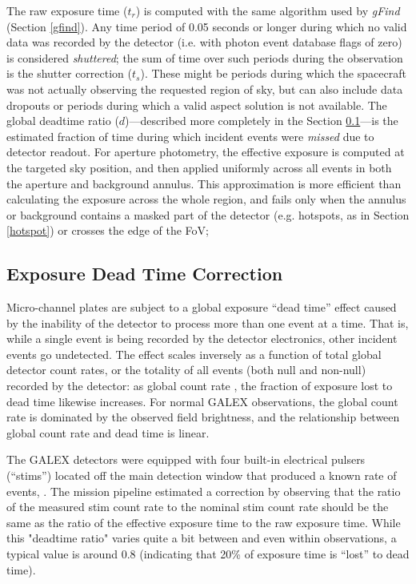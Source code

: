 \documentclass[trackchanges,preprint2]{aastex}
\begin{document}
The raw exposure time ($t_r$) is computed with the same algorithm used by \emph{gFind} (Section \ref{gfind}). Any time period of 0.05 seconds or longer during which no valid data was recorded by the detector (i.e. with photon event database flags of zero) is considered \emph{shuttered}; the sum of time over such periods during the observation is the shutter correction ($t_s$). These might be periods during which the spacecraft was not actually observing the requested region of sky, but can also include data dropouts or periods during which a valid aspect solution is not available. The global deadtime ratio ($d$)---described more completely in the Section \ref{deadtimedesc}---is the estimated fraction of time during which incident events were \emph{missed} due to detector readout. For aperture photometry, the effective exposure is computed at the targeted sky position, and then applied uniformly across all events in both the aperture and background annulus. This approximation is more efficient than calculating the exposure across the whole region, and fails only when the annulus or background contains a masked part of the detector (e.g. hotspots, as in Section \ref{hotspot}) or crosses the edge of the FoV; 

\subsection{Exposure Dead Time Correction}
\label{deadtimedesc}
Micro-channel plates are subject to a global exposure ``dead time'' effect caused by the inability of the detector to process more than one event at a time. That is, while a single event is being recorded by the detector electronics, other incident events go undetected. The effect scales inversely as a function of total global detector count rates, or the totality of all events (both null and non-null) recorded by the detector: as global count rate , the fraction of exposure lost to dead time likewise increases. For normal GALEX observations, the global count rate is dominated by the observed field brightness, and the relationship between global count rate and dead time is linear.

The GALEX detectors were equipped with four built-in electrical pulsers (``stims'') located off the main detection window that produced a known rate of events, . The mission pipeline estimated a correction by observing that the ratio of the measured stim count rate to the nominal stim count rate should be the same as the ratio of the effective exposure time to the raw exposure time. While this "deadtime ratio" varies quite a bit between and even within observations, a typical value is around 0.8 (indicating that 20\% of exposure time is ``lost'' to dead time).
\end{document}
